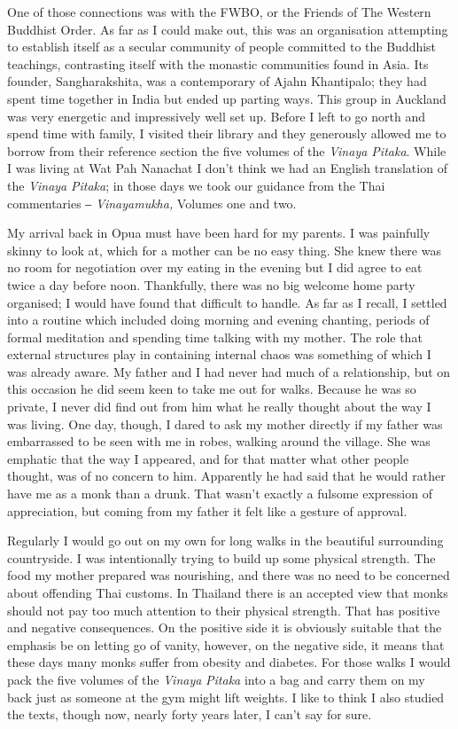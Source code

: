 One of those connections was with the FWBO, or the Friends of The
Western Buddhist Order. As far as I could make out, this was an
organisation attempting to establish itself as a secular community of
people committed to the Buddhist teachings, contrasting itself with the
monastic communities found in Asia. Its founder, Sangharakshita, was a
contemporary of Ajahn Khantipalo; they had spent time together in India
but ended up parting ways. This group in Auckland was very energetic and
impressively well set up. Before I left to go north and spend time with
family, I visited their library and they generously allowed me to borrow
from their reference section the five volumes of the \emph{Vinaya
Pitaka}. While I was living at Wat Pah Nanachat I don't think we had an
English translation of the \emph{Vinaya} \emph{Pitaka}; in those days we
took our guidance from the Thai commentaries ‒ \emph{Vinayamukha,}
Volumes one and two.

My arrival back in Opua must have been hard for my parents. I was
painfully skinny to look at, which for a mother can be no easy thing.
She knew there was no room for negotiation over my eating in the evening
but I did agree to eat twice a day before noon. Thankfully, there was no
big welcome home party organised; I would have found that difficult to
handle. As far as I recall, I settled into a routine which included
doing morning and evening chanting, periods of formal meditation and
spending time talking with my mother. The role that external structures
play in containing internal chaos was something of which I was already
aware. My father and I had never had much of a relationship, but on this
occasion he did seem keen to take me out for walks. Because he was so
private, I never did find out from him what he really thought about the
way I was living. One day, though, I dared to ask my mother directly if
my father was embarrassed to be seen with me in robes, walking around
the village. She was emphatic that the way I appeared, and for that
matter what other people thought, was of no concern to him. Apparently
he had said that he would rather have me as a monk than a drunk. That
wasn't exactly a fulsome expression of appreciation, but coming from my
father it felt like a gesture of approval.

Regularly I would go out on my own for long walks in the beautiful
surrounding countryside. I was intentionally trying to build up some
physical strength. The food my mother prepared was nourishing, and there
was no need to be concerned about offending Thai customs. In Thailand
there is an accepted view that monks should not pay too much attention
to their physical strength. That has positive and negative consequences.
On the positive side it is obviously suitable that the emphasis be on
letting go of vanity, however, on the negative side, it means that these
days many monks suffer from obesity and diabetes. For those walks I
would pack the five volumes of the \emph{Vinaya} \emph{Pitaka} into a
bag and carry them on my back just as someone at the gym might lift
weights. I like to think I also studied the texts, though now, nearly
forty years later, I can't say for sure.

